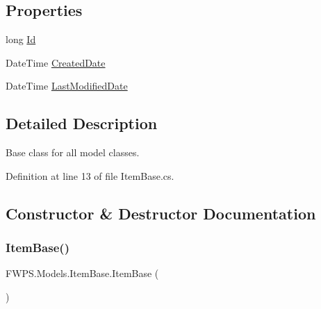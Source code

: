 \subsection*{Properties}
\begin{DoxyCompactItemize}
\item 
long \mbox{\hyperlink{class_f_w_p_s_1_1_models_1_1_item_base_a89bba106f727802820a2837a0d1b43aa}{Id}}
\item 
Date\+Time \mbox{\hyperlink{class_f_w_p_s_1_1_models_1_1_item_base_ac6cfe82fa30c36fe9fcca011718358a1}{Created\+Date}}
\item 
Date\+Time \mbox{\hyperlink{class_f_w_p_s_1_1_models_1_1_item_base_aa1898fe3e7fc189e4f73ad556339606f}{Last\+Modified\+Date}}
\end{DoxyCompactItemize}


\subsection{Detailed Description}
Base class for all model classes. 

Definition at line 13 of file Item\+Base.\+cs.



\subsection{Constructor \& Destructor Documentation}
\mbox{\label{class_f_w_p_s_1_1_models_1_1_item_base_a07172aa2fec852152ef0269966869756}} 
\subsubsection{\texorpdfstring{Item\+Base()}{ItemBase()}}
{\footnotesize\ttfamily F\+W\+P\+S.\+Models.\+Item\+Base.\+Item\+Base (\begin{DoxyParamCaption}{ }\end{DoxyParamCaption})\hspace{0.3cm}{\ttfamily [protected]}}



